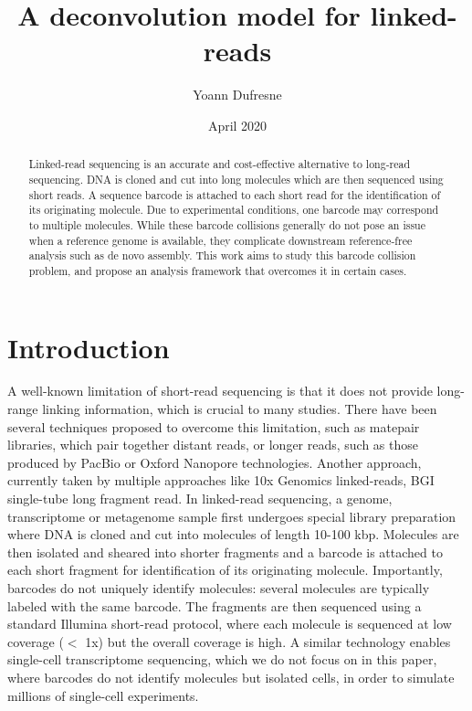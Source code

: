 \documentclass{article}
\title{A deconvolution model for linked-reads}
\author{Yoann Dufresne}
\date{April 2020}
\begin{document}
\maketitle

\begin{abstract}
Linked-read sequencing is an accurate and cost-effective alternative to long-read sequencing. DNA is cloned and cut into long molecules which are then sequenced using short reads. A sequence barcode is attached to each short read for the identification of its originating molecule. Due to experimental conditions, one barcode may correspond to multiple molecules. While these barcode collisions generally do not pose an issue when a reference genome is available, they complicate downstream reference-free analysis such as de novo assembly. This work aims to study this barcode collision problem, and propose an analysis framework that overcomes it in certain cases.
\end{abstract}


\section{Introduction}

A well-known limitation of short-read sequencing is that it does not provide long-range linking information, which is crucial to many studies.
There have been several techniques proposed to overcome this limitation, such as matepair libraries, which pair together distant reads, or longer reads, such as those produced by PacBio or Oxford Nanopore technologies.
Another approach, currently taken by  multiple approaches like 10x Genomics linked-reads, BGI single-tube long fragment read.
In linked-read sequencing, a genome, transcriptome or metagenome sample first undergoes special library preparation where DNA is cloned and cut into molecules of length 10-100 kbp.
Molecules are then isolated and sheared into shorter fragments and a barcode is attached to each short fragment for identification of its originating molecule.
Importantly, barcodes do not uniquely identify molecules: several molecules are typically labeled with the same barcode.
The fragments are then sequenced using a standard Illumina short-read protocol, where each molecule is sequenced at low coverage ($<$ 1x) but the overall coverage is high.
A similar technology enables single-cell transcriptome sequencing, which we do not focus on in this paper, where barcodes do not identify molecules but isolated cells, in order to simulate millions of single-cell experiments. %
\end{document}
